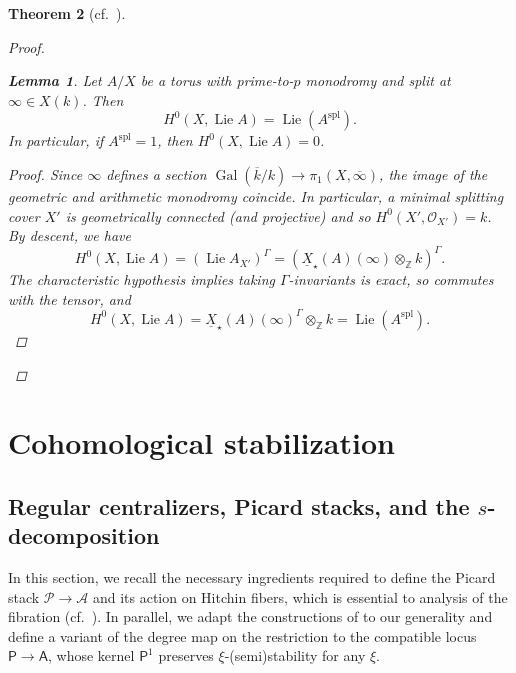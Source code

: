 \documentclass[openany]{amsbook}
\newtheorem{theorem}{Theorem}[chapter]
\newtheorem{lemma}[theorem]{Lemma}
\theoremstyle{definition}
\theoremstyle{remark}
\numberwithin{equation}{section}
\newcommand{\Z}{\mathbb{Z}}
\renewcommand{\O}{\mathcal{O}}
\newcommand{\cA}{\mathcal{A}}
\newcommand{\cP}{\mathcal{P}}
\newcommand{\ol}[1]{\overline{#1}}
\newcommand{\ul}[1]{\underline{#1}}
\newcommand{\Gal}{\operatorname{Gal}}
\renewcommand{\-}{\operatorname{-}}
\newcommand{\on}[1]{\operatorname{#1}}
\newcommand{\bA}{\mathsf{A}}
\newcommand{\bP}{\mathsf{P}}
\newcommand{\Lie}{\on{Lie}}
\newcommand{\spl}{\mathrm{spl}}
\begin{document}
\begin{theorem}[{{cf.\ \cite[Th\'{e}or\`{e}me 10.1.1]{CLI}}}]
\begin{proof}
                                                        
    \begin{lemma}\label{lem.good.char.torus.lie.alg}
        Let $A/X$ be a torus with prime-to-$p$ monodromy and split at $\infty \in X(k)$. Then
        $$
            H^0(X, \Lie A) = \Lie(A^{\spl}).
        $$
        In particular, if $A^\spl = 1$, then $H^0(X, \Lie A) = 0$.
        \begin{proof}
            Since $\infty$ defines a section $\Gal(\ol{k}/k) \to \pi_1(X, \ol{\infty})$, the image of the geometric and arithmetic monodromy coincide. In particular, a minimal splitting cover $X'$ is \textit{geometrically} connected (and projective) and so $H^0(X', \O_{X'}) = k$. By descent, we have
            $$
                H^0(X, \Lie A) = (\Lie A_{X'})^\Gamma = (\ul{X}_\star(A)(\infty) \otimes_{\Z} k)^\Gamma.
            $$
            The characteristic hypothesis implies taking $\Gamma$-invariants is exact, so commutes with the tensor, and
            $$
                H^0(X, \Lie A) = \ul{X}_\star(A)(\infty)^\Gamma \otimes_{\Z} k = \Lie(A^{\spl}).
            $$
        \end{proof}
    \end{lemma}
    
    \end{proof}
\end{theorem}









\part{Cohomological stabilization}


\chapter{\texorpdfstring{Regular centralizers, Picard stacks, and the $s$-decomposition}{Regular centralizers, Picard stacks, and the s-decomposition}}\label{sect.reg.cent.Pic}

In this section, we recall the necessary ingredients required to define the Picard stack $\cP \to \cA$ and its action on Hitchin fibers, which is essential to analysis of the fibration (cf.\ \cite[\S 4]{ngofl}). In parallel, we adapt the constructions of \cite[\S 3, 5]{CLII} to our generality and define a variant of the degree map on the restriction to the compatible locus $\bP \to \bA$, whose kernel $\bP^{1}$ preserves $\xi$-(semi)stability for any $\xi$.
\end{document}
